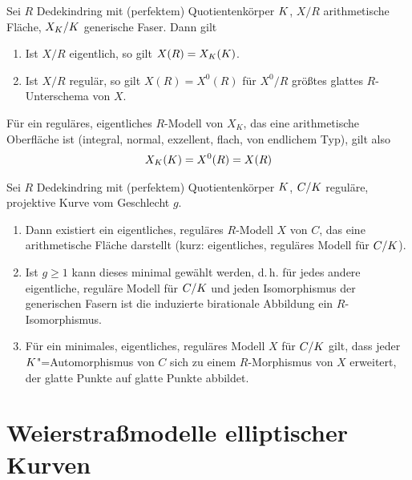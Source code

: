 \documentclass[german]{scrreprt}
\begin{document}
\begin{Satz}\label{thm:ratpkteregulaeremodelle}
  Sei $R$ Dedekindring mit (perfektem) Quotientenkörper $K$,
  $X/R$ arithmetische Fläche, $X_{K}/K$ generische Faser.
  Dann gilt
  \begin{enumerate}[label=(\roman*)]
  \item Ist $X/R$ eigentlich, so gilt $X(R)=X_{K}(K)$.
  \item Ist $X/R$ regulär, so gilt $X(R)=X^0(R)$ für $X^0/R$ größtes
    glattes $R$-Unterschema von $X$.
  \end{enumerate}
  \cite[Corollary IV.4.4]{silverman2}

  Für ein reguläres, eigentliches $R$-Modell von $X_K$, das eine
  arithmetische Oberfläche ist (integral, normal, exzellent, flach,
  von endlichem Typ), gilt also
  \begin{gather*}
    X_{K}(K)=X^0(R)=X(R)
  \end{gather*}
\end{Satz}

\begin{Satz}
  Sei $R$ Dedekindring mit (perfektem) Quotientenkörper $K$,
  $C/K$ reguläre, projektive Kurve vom Geschlecht $g$.
  \begin{enumerate}[label=(\roman*)]
  \item Dann existiert ein eigentliches, reguläres $R$-Modell $X$ von $C$,
    das eine arithmetische Fläche darstellt
    (kurz: eigentliches, reguläres Modell für $C/K$).
    \cite[Proposition IV.4.5(a)]{silverman2}
  \item Ist $g\geq1$ kann dieses minimal gewählt werden, d.\,h.
    für jedes andere eigentliche, reguläre Modell für $C/K$ und jeden
    Isomorphismus der generischen Fasern ist die induzierte birationale
    Abbildung
    ein $R$-Isomorphismus.
    \cite[Proposition IV.4.5(b)]{silverman2}
  \item Für ein minimales, eigentliches, reguläres Modell $X$ für $C/K$
    gilt, dass jeder $K$"=Automorphismus von $C$ sich zu einem
    $R$-Morphismus von $X$ erweitert, der glatte Punkte auf glatte
    Punkte abbildet.
    \cite[Proposition IV.4.6]{silverman2}
  \end{enumerate}
\end{Satz}


\section{Weierstraßmodelle elliptischer Kurven}
\end{document}
